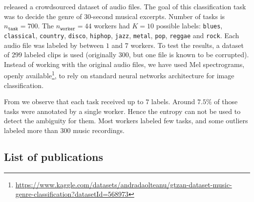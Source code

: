 \citet{rodrigues2014gaussian} released a crowdsourced dataset of audio files.
The goal of this classification task was to decide the genre of $ 30$-second musical excerpts. Number of tasks is $n_{\texttt{task}}=700$.
The $n_{\texttt{worker}}=44$ workers had $K=10$ possible labels: \texttt{blues}, \texttt{classical}, \texttt{country}, \texttt{disco}, \texttt{hiphop}, \texttt{jazz}, \texttt{metal}, \texttt{pop}, \texttt{reggae} and \texttt{rock}.
Each audio file was labeled by between $1$ and $7$ workers.
To test the results, a dataset of $299$ labeled clips is used (originally $300$, but one file is known to be corrupted).
Instead of working with the original audio files, we have used Mel spectrograms, openly available\footnote{ \scriptsize \url{https://www.kaggle.com/datasets/andradaolteanu/gtzan-dataset-music-genre-classification?datasetId=568973}}, to rely on standard neural networks architecture for image classification.

From  we observe that each task received up to $7$ labels. Around $7.5\%$ of those tasks were annotated by a single worker. Hence the entropy can not be used to detect the ambiguity for them.
Most workers labeled few tasks, and some outliers labeled more than $300$ music recordings.

\subsection{List of publications}

